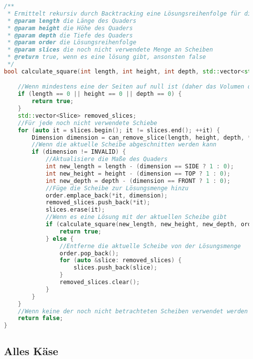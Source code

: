 \documentclass[a4paper,10pt,ngerman]{scrartcl}
\begin{document}
    \begin{lstlisting}[frame=single,language=C++,title=Methode calculate\_square,breaklines=true,label={lst:code_calculateSquare}]
/**
 * Ermittelt rekursiv durch Backtracking eine Lösungsreihenfolge für die gegebene Menge an Scheiben.
 * @param length die Länge des Quaders
 * @param height die Höhe des Quaders
 * @param depth die Tiefe des Quaders
 * @param order die Lösungsreihenfolge
 * @param slices die noch nicht verwendete Menge an Scheiben
 * @return true, wenn es eine lösung gibt, ansonsten false
 */
bool calculate_square(int length, int height, int depth, std::vector<std::pair<Slice, Dimension>> &order, std::vector<Slice> &slices) {

    //Wenn mindestens eine der Seiten auf null ist (daher das Volumen des Quaders null ist)
    if (length == 0 || height == 0 || depth == 0) {
        return true;
    }
    std::vector<Slice> removed_slices;
    //Für jede noch nicht verwendete Schiebe
    for (auto it = slices.begin(); it != slices.end(); ++it) {
        Dimension dimension = can_remove_slice(length, height, depth, *it);
        //Wenn die aktuelle Scheibe abgeschnitten werden kann
        if (dimension != INVALID) {
            //Aktualisiere die Maße des Quaders
            int new_length = length - (dimension == SIDE ? 1 : 0);
            int new_height = height - (dimension == TOP ? 1 : 0);
            int new_depth = depth - (dimension == FRONT ? 1 : 0);
            //Füge die Scheibe zur Lösungsmenge hinzu
            order.emplace_back(*it, dimension);
            removed_slices.push_back(*it);
            slices.erase(it);
            //Wenn es eine Lösung mit der aktuellen Scheibe gibt
            if (calculate_square(new_length, new_height, new_depth, order, slices)) {
                return true;
            } else {
                //Entferne die aktuelle Scheibe von der Lösungsmenge
                order.pop_back();
                for (auto &slice: removed_slices) {
                    slices.push_back(slice);
                }
                removed_slices.clear();
            }
        }
    }
    //Wenn keine der noch nicht betrachteten Scheiben verwendet werden kann
    return false;
}
    \end{lstlisting}

    \newpage

    \subsection{Alles Käse}\label{subsec:alles-kaese}
\end{document}

